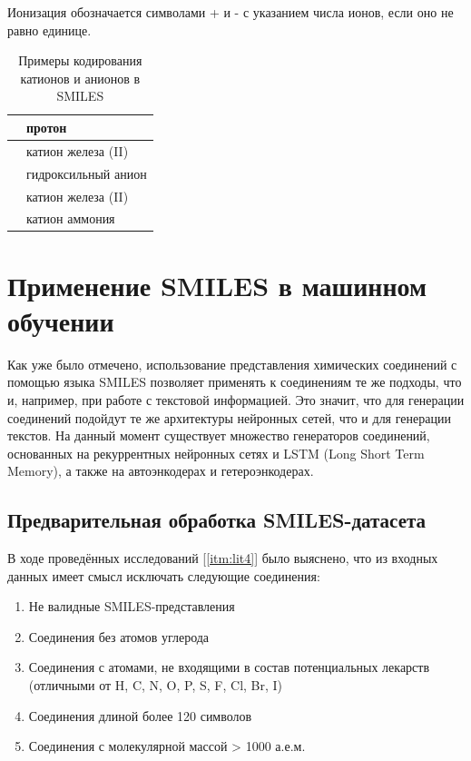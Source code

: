 \documentclass[a4paper,14pt]{extreport}
\begin{document}
Ионизация обозначается символами + и - с указанием числа ионов, если оно не равно единице.

\begin{table}[H]
\caption{Примеры кодирования катионов и анионов в SMILES}
\begin{center}
\begin{tabular}{|l|l|}
\hline
	[H+] & протон\\
\hline
	[Fe++2] & катион железа (II)\\
\hline
	[OH-] & гидроксильный анион\\
\hline
	[Fe++] & катион железа (II)\\
\hline
	[NH4+] & катион аммония\\
\hline
\end{tabular}
\end{center}
\end{table}

  \section{Применение SMILES в машинном обучении}
  \label{s:smiles_application}
  Как уже было отмечено, использование представления химических соединений с помощью языка SMILES позволяет применять к соединениям те же подходы, что и, например, при работе с текстовой информацией. Это значит, что для генерации соединений подойдут те же архитектуры нейронных сетей, что и для генерации текстов. На данный момент существует множество генераторов соединений, основанных на рекуррентных нейронных сетях и LSTM (Long Short Term Memory), а также на автоэнкодерах и гетероэнкодерах.
  \subsection{Предварительная обработка SMILES-датасета}
  \label{ss:smiles_preprocessing_subsec}
  В ходе проведённых исследований [\ref{itm:lit4}] было выяснено, что из входных данных имеет смысл исключать следующие соединения:
  \begin{enumerate}
  \item Не валидные SMILES-представления
  \item Соединения без атомов углерода
  \item Соединения с атомами, не входящими в состав потенциальных лекарств (отличными от H, C, N, O, P, S, F, Cl, Br, I)
  \item Соединения длиной более 120 символов
  \item Соединения с молекулярной массой > 1000 а.е.м.

  \end{enumerate}
  
\end{document}
